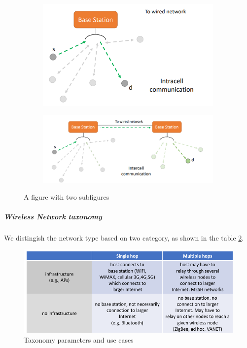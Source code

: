 \documentclass[10pt,a4paper]{report}
\theoremstyle{definition}
\begin{document}
\begin{itemize}
\begin{figure}
	\centering
	\begin{subfigure}{.5\textwidth}
		\centering
		\includegraphics[width=.9\linewidth]{images/Pasted image 20230531102906.png}
	\end{subfigure}%
	\begin{subfigure}{.5\textwidth}
		\centering
		\includegraphics[width=.9\linewidth]{images/Pasted image 20230531102921.png}
	\end{subfigure}
	\caption{A figure with two subfigures}
	\label{intra-intercell-comm}
\end{figure}

\end{itemize}


\subparagraph{Wireless Network taxonomy}\label{sec:wireless-network-taxonomy}
We distingish the network type based on two category, as shown in the table \ref{infra-table}.
\begin{figure}[h]
	\centering\includegraphics[scale=0.50]{images/Pasted image 20230224163936.png}
	\caption{Taxonomy parameters and use cases}
	\label{infra-table}
\end{figure}
\end{document}
